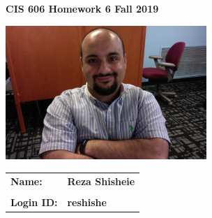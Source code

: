 \documentclass[11pt]{article}
\begin{document}
\thispagestyle{plain}

\begin{center}
{\Large \bf CIS 606 \hfil Homework 6 \hfil Fall 2019} \\%
\end{center}

\vskip 1in 

\centerline{\includegraphics[width=3in]{photo.jpg}}

\vskip 0.5in 


\begin{center}
\begin{tabular}{ll}
{\bf Name:}     & {\bf Reza Shisheie } \\ \\
{\bf Login ID:} & {\bf reshishe }   
\end{tabular}
\end{center}

\newpage
\end{document}
